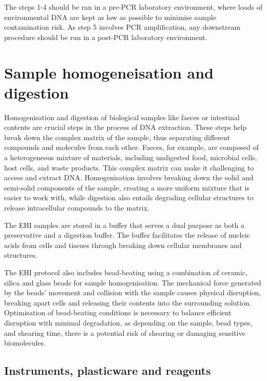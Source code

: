 \documentclass[
]{book}
\begin{document}
The steps 1-4 should be ran in a pre-PCR laboratory environment, where loads of environmental DNA are kept as low as possible to minimise sample contamination risk. As step 5 involves PCR amplification, any downstream procedure should be run in a post-PCR laboratory environment.

\hypertarget{sample-digestion}{%
\chapter{Sample homogeneisation and digestion}\label{sample-digestion}}

Homogenisation and digestion of biological samples like faeces or intestinal contents are crucial steps in the process of DNA extraction. These steps help break down the complex matrix of the sample, thus separating different compounds and molecules from each other. Faeces, for example, are composed of a heterogeneous mixture of materials, including undigested food, microbial cells, host cells, and waste products. This complex matrix can make it challenging to access and extract DNA. Homogenisation involves breaking down the solid and semi-solid components of the sample, creating a more uniform mixture that is easier to work with, while digestion also entails degrading cellular structures to release intracellular compounds to the matrix.

The EHI samples are stored in a buffer that serves a dual purpose as both a preservative and a digestion buffer. The buffer facilitates the release of nucleic acids from cells and tissues through breaking down cellular membranes and structures.

The EHI protocol also includes bead-beating using a combination of ceramic, silica and glass beads for sample homogenisation. The mechanical force generated by the beads' movement and collision with the sample causes physical disruption, breaking apart cells and releasing their contents into the surrounding solution. Optimisation of bead-beating conditions is necessary to balance efficient disruption with minimal degradation, as depending on the sample, bead types, and shearing time, there is a potential risk of shearing or damaging sensitive biomolecules.

\hypertarget{instruments-plasticware-and-reagents}{%
\section{Instruments, plasticware and reagents}\label{instruments-plasticware-and-reagents}}
\end{document}

